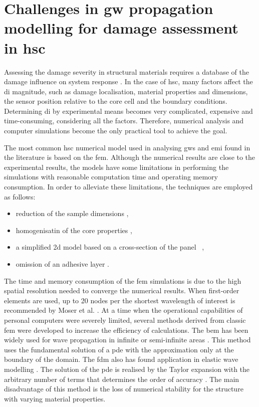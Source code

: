 \section{Challenges in \acl{gw} propagation modelling for damage assessment in \acl{hsc}}
\label{sec:challenges}

Assessing the damage severity in structural materials requires a database of the damage influence on system response \cite{worden2007fundamental}.
In the case of \ac{hsc}, many factors affect the \ac{di} magnitude, such as damage localisation, material properties and dimensions, the sensor position relative to the core cell and the boundary conditions.
Determining \ac{di} by experimental means becomes very complicated, expensive and time-consuming, considering all the factors.
Therefore, numerical analysis and computer simulations become the only practical tool to achieve the goal.

The most common \ac{hsc} numerical model used in analysing \acp{gw} and \ac{emi} found in the literature is based on the \ac{fem}.
Although the numerical results are close to the experimental results, the models have some limitations in performing the simulations with reasonable computation time and operating memory consumption.
In order to alleviate these limitations, the techniques are employed as follows:
\begin{itemize}
\item reduction of the sample dimensions \cite{hosseini2013numerical, tian2015wavenumber},
\item homogenisatin of the core properties \cite{catapano2014multi, zhou2020debonding},
\item a simplified \acl{2d} model based on a cross-section of the panel~ \cite{li2019detection},
\item omission of an adhesive layer \cite{mustapha2013non}.
\end{itemize}

The time and memory consumption of the \ac{fem} simulations is due to the high spatial resolution needed to converge the numerical results.
When first-order elements are used, up to 20 nodes per the shortest wavelength of interest is recommended by Moser et al. \cite{moser1999modeling}.
At a time when the operational capabilities of personal computers were severely limited, several methods derived from classic \ac{fem} were developed to increase the efficiency of calculations.
The \ac{bem} has been widely used for wave propagation in infinite or semi-infinite areas \cite{brebbia1984boundary}.
This method uses the fundamental solution of a \ac{pde} with the approximation only at the boundary of the domain.
The \ac{fdm} also has found application in elastic wave modelling \cite{delsantoO1992connection}.
The solution of the \ac{pde} is realised by the Taylor expansion with the arbitrary number of terms that determines the order of accuracy \cite{willberg2015simulation}.
The main disadvantage of this method is the loss of numerical stability for the structure with varying material properties.

